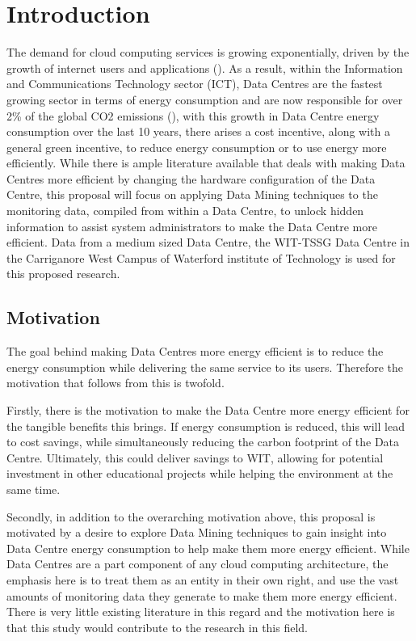 \documentclass[12pt]{scrartcl}
\begin{document}
\section{Introduction}
\label{sec:[introduction]}
The demand for cloud computing services is growing exponentially, driven by the growth of internet users and applications (\cite{edssch.qt9c84f49g20130101}). As a result, within the Information and Communications Technology sector (ICT), Data Centres are the fastest growing sector in terms of energy consumption and are now responsible for over 2\% of the global CO2 emissions (\cite{edsbas.13818AC20170101}), with this growth in Data Centre energy consumption over the last 10 years, there arises a cost incentive, along with a general green incentive, to reduce energy consumption or to use energy more efficiently. While there is ample literature available that deals with making Data Centres more efficient by changing the hardware configuration of the Data Centre, this proposal will focus on applying Data Mining techniques to the monitoring data, compiled from within a Data Centre, to unlock hidden information to assist system administrators to make the Data Centre more efficient. Data from a medium sized Data Centre, the WIT-TSSG Data Centre in the Carriganore West Campus of Waterford institute of Technology is used for this proposed research.  


\subsection{Motivation}
\label{subsec:[Motivation]}
The goal behind making Data Centres more energy efficient is to reduce the energy consumption while delivering the same service to its users. Therefore the motivation that follows from this is twofold. 

Firstly, there is the motivation to make the Data Centre more energy efficient for the tangible benefits this brings. If energy consumption is reduced, this will lead to cost savings, while simultaneously reducing the carbon footprint of the Data Centre. Ultimately, this could deliver savings to WIT, allowing for potential investment in other educational projects while helping the environment at the same time. 

Secondly, in addition to the overarching motivation above, this proposal is motivated by a desire to explore Data Mining techniques to gain insight into Data Centre energy consumption to help make them more energy efficient. While Data Centres are a part component of any cloud computing architecture, the emphasis here is to treat them as an entity in their own right, and use the vast amounts of monitoring data they generate to make them more energy efficient. There is very little existing literature in this regard and the motivation here is that this study would contribute to the research in this field.  
\end{document}
